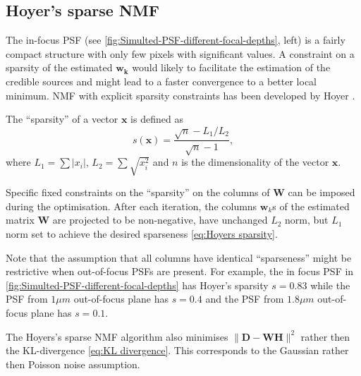 \subsection{Hoyer's sparse NMF \label{sub:Hoyer}}
The in-focus PSF (see \autoref{fig:Simulted-PSF-different-focal-depths}, left) is a fairly compact structure with only few pixels with significant values. A constraint on a sparsity of the estimated $\bm{w_{k}}$ would likely to facilitate the estimation of the credible sources and might lead to a faster convergence to a better local minimum. NMF with explicit sparsity constraints has been developed by Hoyer  \cite{Hoyer2004}. 

The ``sparsity'' of a vector $\bm{x}$ is defined as 
%
\begin{equation}
	s(\bm{x})=\frac{\sqrt{n}-L_{1}/L_{2}}{\sqrt{n}-1},
	\label{eq:Hoyers sparsity}
\end{equation}
%
where $L_{1}=\sum|x_{i}|$, $L_{2}=\sum \sqrt{x^{2}_{i}}$ and $n$ is the dimensionality of the vector $\bm{x}$.

Specific fixed constraints on the ``sparsity'' on the columns of $\bm{W}$ can be imposed during the optimisation. After each iteration, the columns $\bm{w}_{k}$s of the estimated matrix $\bm{W}$ are projected to be non-negative, have unchanged $L_{2}$ norm, but $L_{1}$ norm set to achieve the desired sparseness \autoref{eq:Hoyers sparsity}.

Note that the assumption that all columns have identical ``sparseness'' might be restrictive when out-of-focus PSFs are present. For example, the in focus PSF in \autoref{fig:Simulted-PSF-different-focal-depths} has Hoyer's sparsity $s=0.83$ while the PSF from $1 \unit{\mu m}$ out-of-focus plane has $s=0.4$ and the PSF from $1.8 \unit{\mu m}$ out-of-focus plane  has $s=0.1$.

The Hoyers's sparse NMF algorithm also minimises $\|\bm{D} - \bm{WH}\|^{2}$ rather then the KL-divergence \autoref{eq:KL divergence}. This corresponds to the Gaussian rather then Poisson noise assumption. 


